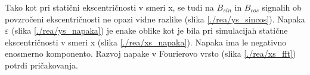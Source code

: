 Tako kot pri statični ekscentričnosti v smeri x, se tudi na $B_{sin}$ in $B_{cos}$ signalih ob povzročeni ekscentričnosti ne opazi vidne razlike (slika \ref{./rea/ys_sincos}). Napaka $\varepsilon$ (slika \ref{./rea/ys_napaka}) je enake oblike kot je bila pri simulacijah statične ekscentričnosti v smeri x (slika \ref{./rea/xs_napaka}). Napaka ima le negativno enosmerno komponento. Razvoj napake v Fourierovo vrsto (slika \ref{./rea/xs_fft}) potrdi pričakovanja.%
\newpage
